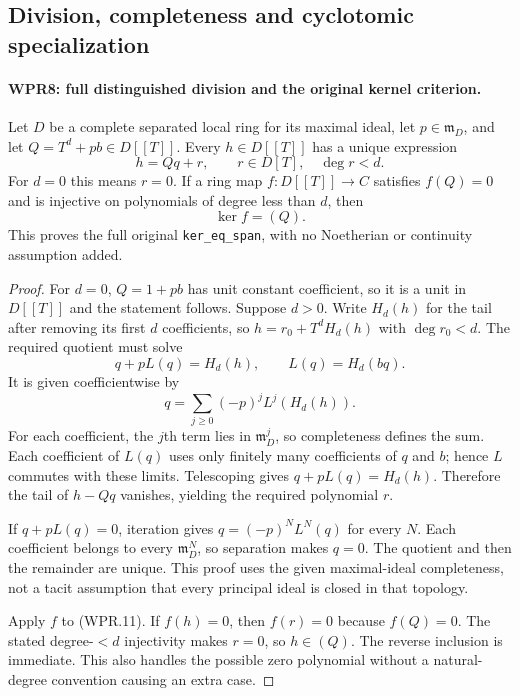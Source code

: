 \subsection{Division, completeness and cyclotomic specialization}

\paragraph{WPR8: full distinguished division and the original kernel criterion.}
\label{claim:WPR8}
Let $D$ be a complete separated local ring for its maximal ideal,
let $p\in\mathfrak m_D$, and let
$Q=T^d+pb\in D[[T]]$. Every $h\in D[[T]]$ has a unique
expression
\[
                     h=Qq+r,\qquad r\in D[T],\quad\deg r<d.
 \tag{WPR.11}
\]
For $d=0$ this means $r=0$. If a ring map $f:D[[T]]\to C$
satisfies $f(Q)=0$ and is injective on polynomials of degree
less than $d$, then
\[
                              \ker f=(Q).
 \tag{WPR.12}
\]
This proves the full original \texttt{ker\_eq\_span}, with no
Noetherian or continuity assumption added.

\begin{proof}
For $d=0$, $Q=1+pb$ has unit constant coefficient, so it is a
unit in $D[[T]]$ and the statement follows. Suppose $d>0$.
Write $H_d(h)$ for the tail after removing its first $d$
coefficients, so $h=r_0+T^dH_d(h)$ with $\deg r_0<d$.
The required quotient must solve
\[
       q+pL(q)=H_d(h),\qquad L(q)=H_d(bq).
\]
It is given coefficientwise by
\[
                       q=\sum_{j\geq0}(-p)^jL^j(H_d(h)).
\]
For each coefficient, the $j$th term lies in
$\mathfrak m_D^j$, so completeness defines the sum.
Each coefficient of $L(q)$ uses only finitely many coefficients
of $q$ and $b$; hence $L$ commutes with these limits.
Telescoping gives $q+pL(q)=H_d(h)$. Therefore the tail of
$h-Qq$ vanishes, yielding the required polynomial $r$.

If $q+pL(q)=0$, iteration gives
$q=(-p)^NL^N(q)$ for every $N$. Each coefficient belongs to
every $\mathfrak m_D^N$, so separation makes $q=0$.
The quotient and then the remainder are unique. This proof uses
the given maximal-ideal completeness, not a tacit assumption that
every principal ideal is closed in that topology.

Apply $f$ to (WPR.11). If $f(h)=0$, then $f(r)=0$ because
$f(Q)=0$. The stated degree-$<d$ injectivity makes $r=0$,
so $h\in(Q)$. The reverse inclusion is immediate. This also
handles the possible zero polynomial without a natural-degree
convention causing an extra case.
\end{proof}


